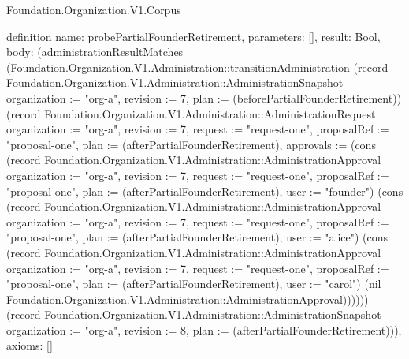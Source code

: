 \begin{lexlean}{Foundation.Organization.V1.Corpus}
\begin{semanticmodule}
definition{
  name: probePartialFounderRetirement,
  parameters: [],
  result: Bool,
  body: (administrationResultMatches (Foundation.Organization.V1.Administration::transitionAdministration (record Foundation.Organization.V1.Administration::AdministrationSnapshot {organization := "org-a", revision := 7, plan := (beforePartialFounderRetirement)}) (record Foundation.Organization.V1.Administration::AdministrationRequest {organization := "org-a", revision := 7, request := "request-one", proposalRef := "proposal-one", plan := (afterPartialFounderRetirement), approvals := (cons (record Foundation.Organization.V1.Administration::AdministrationApproval {organization := "org-a", revision := 7, request := "request-one", proposalRef := "proposal-one", plan := (afterPartialFounderRetirement), user := "founder"}) (cons (record Foundation.Organization.V1.Administration::AdministrationApproval {organization := "org-a", revision := 7, request := "request-one", proposalRef := "proposal-one", plan := (afterPartialFounderRetirement), user := "alice"}) (cons (record Foundation.Organization.V1.Administration::AdministrationApproval {organization := "org-a", revision := 7, request := "request-one", proposalRef := "proposal-one", plan := (afterPartialFounderRetirement), user := "carol"}) (nil Foundation.Organization.V1.Administration::AdministrationApproval))))})) (record Foundation.Organization.V1.Administration::AdministrationSnapshot {organization := "org-a", revision := 8, plan := (afterPartialFounderRetirement)})),
  axioms: []
}


\end{semanticmodule}
\end{lexlean}
